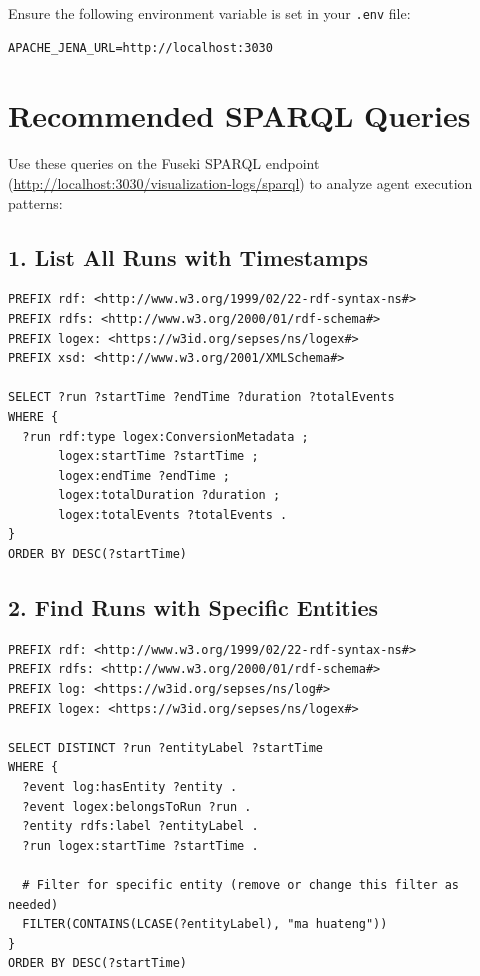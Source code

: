 Ensure the following environment variable is set in your \texttt{.env} file:

\begin{lstlisting}
APACHE_JENA_URL=http://localhost:3030
\end{lstlisting}

\section*{Recommended SPARQL Queries}

Use these queries on the Fuseki SPARQL endpoint (\url{http://localhost:3030/visualization-logs/sparql}) to analyze agent execution patterns:

\subsection*{1. List All Runs with Timestamps}

\begin{lstlisting}[language=sparql]
PREFIX rdf: <http://www.w3.org/1999/02/22-rdf-syntax-ns#>
PREFIX rdfs: <http://www.w3.org/2000/01/rdf-schema#>
PREFIX logex: <https://w3id.org/sepses/ns/logex#>
PREFIX xsd: <http://www.w3.org/2001/XMLSchema#>

SELECT ?run ?startTime ?endTime ?duration ?totalEvents
WHERE {
  ?run rdf:type logex:ConversionMetadata ;
       logex:startTime ?startTime ;
       logex:endTime ?endTime ;
       logex:totalDuration ?duration ;
       logex:totalEvents ?totalEvents .
} 
ORDER BY DESC(?startTime)
\end{lstlisting}

\subsection*{2. Find Runs with Specific Entities}

\begin{lstlisting}[language=sparql]
PREFIX rdf: <http://www.w3.org/1999/02/22-rdf-syntax-ns#>
PREFIX rdfs: <http://www.w3.org/2000/01/rdf-schema#>
PREFIX log: <https://w3id.org/sepses/ns/log#>
PREFIX logex: <https://w3id.org/sepses/ns/logex#>

SELECT DISTINCT ?run ?entityLabel ?startTime
WHERE {
  ?event log:hasEntity ?entity .
  ?event logex:belongsToRun ?run .
  ?entity rdfs:label ?entityLabel .
  ?run logex:startTime ?startTime .
  
  # Filter for specific entity (remove or change this filter as needed)
  FILTER(CONTAINS(LCASE(?entityLabel), "ma huateng"))
}
ORDER BY DESC(?startTime)
\end{lstlisting}

